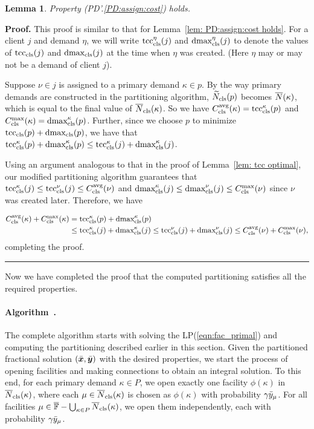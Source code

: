 \documentclass[oneside,final]{ucr}
\newtheorem{lemma}[theorem]{Lemma}
\newenvironment{proof}[1][Proof]{\textbf{#1.} }{\ \rule{0.5em}{0.5em}}
\def\dsp{\def\baselinestretch{2.0}\large\normalsize}
\def\ssp{\def\baselinestretch{1.0}\large\normalsize}
\begin{document}

\begin{lemma}\label{lem: PD1: primary optimal}
  Property (PD'.\ref{PD:assign:cost}) holds.
\end{lemma}
\begin{proof}
This proof is similar to that for Lemma~\ref{lem: PD:assign:cost holds}.
For a client $j$ and demand $\eta$, we will write
$\tcccls^\eta(j)$ and $\dmaxcls^\eta(j)$ to denote the values of
$\tcccls(j)$ and $\dmaxcls(j)$ at the time when $\eta$
was created. (Here $\eta$ may or may not be a demand of client $j$).

Suppose $\nu \in j$ is assigned to a primary demand $\kappa \in p$.
By the way primary demands are constructed in the partitioning
algorithm, $\wtildeclsnb(p)$ becomes $\wbarN(\kappa)$, which is equal
to the final value of $\wbarclsnb(\kappa)$. So we have
$\clsdist(\kappa) = \tcccls^\kappa (p)$ and $\clsmax(\kappa) =
\dmaxcls^\kappa(p)$. Further, since we choose $p$ to minimize
$\tcccls(p) + \dmaxcls(p)$, we have that $\tcccls^\kappa(p) +
\dmaxcls^\kappa(p) \leq \tcccls^\kappa(j) + \dmaxcls^\kappa(j)$.

Using an argument analogous to that in the proof of Lemma~\ref{lem: tcc optimal}, 
our modified partitioning algorithm guarantees that
  $\tcccls^{\kappa}(j) \leq \tcccls^{\nu}(j) \leq \clsdist(\nu)$ and
  $\dmaxcls^{\kappa}(j) \leq \dmaxcls^{\nu}(j) \leq \clsmax(\nu)$ since $\nu$ was
  created later.
  Therefore, we have

\ssp
  \begin{align*}
    \clsdist(\kappa) + \clsmax(\kappa) &= \tcccls^{\kappa}(p) +	\dmaxcls^{\kappa}(p) 
					\\
					&\leq \tcccls^{\kappa}(j) + \dmaxcls^{\kappa}(j) 
					\leq \tcccls^{\nu}(j) + \dmaxcls^{\nu}(j) 
					\leq \clsdist(\nu) + \clsmax(\nu),
  \end{align*}
\dsp
completing the proof.
\end{proof}


Now we have completed the proof that the computed partitioning satisfies
all the required properties. 


\paragraph{Algorithm~{\EBGS}.}
The complete algorithm starts with solving the LP(\ref{eqn:fac_primal}) and
computing the partitioning described earlier in this section.  Given
the partitioned fractional solution $(\barbfx, \barbfy)$ with the
desired properties, we start the process of opening facilities and
making connections to obtain an integral solution. To this end, for
each primary demand $\kappa\in P$, we open exactly one facility
$\phi(\kappa)$ in $\wbarclsnb(\kappa)$, where each
$\mu\in\wbarclsnb(\kappa)$ is chosen as $\phi(\kappa)$ with
probability $\gamma\bary_{\mu}$. For all facilities
$\mu\in\facilityset - \bigcup_{\kappa\in P}\wbarclsnb(\kappa)$, we
open them independently, each with probability
$\gamma\bary_{\mu}$. 
\end{document}
